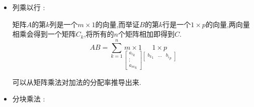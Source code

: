 \documentclass[UTF8,12pt]{ctexbook}
\newcommand{\upDownSum}[2]{\sum\limits_{#2}^{#1}}
\begin{document}
{{{{{\begin{itemize}
{            $$
              a_iB = \begin{bmatrix}
                {a_i}_1 & {a_i}_2 & \dots & {a_i}_n
              \end{bmatrix}
              \begin{bmatrix}
                -- & b_1    & -- \\
                -- & b_2    & -- \\
                \  & \vdots & \  \\
                \  & \vdots & \  \\
                -- & b_n    & --
              \end{bmatrix}
            $$

            $$
              =
              {a_i}_1\begin{bmatrix}
                -- & b_1 & --
              \end{bmatrix}
              +
              {a_i}_2\begin{bmatrix}
                -- & b_2 & --
              \end{bmatrix}
              +
              \dots
              +
              {a_i}_n\begin{bmatrix}
                -- & b_n & --
              \end{bmatrix}
            $$
            }
      \item {
            列乘以行 :

            矩阵$A$的第$k$列是一个$m \times 1$的向量,而举证$B$的第$k$行是一个$1 \times p$的向量,两向量相乘会得到一个矩阵$C_k$,将所有的$n$个矩阵相加即得到$C$.
            $$
              AB = \upDownSum{n}{k = 1}\underset{\begin{bmatrix}
                  {a_i}_k \\
                  \vdots  \\
                  {a_m}_k
                \end{bmatrix}
              }{
                m \times 1
              }
              \underset{\begin{bmatrix}
                  {b_k}_1 & \dots & {b_i}_p
                \end{bmatrix}
              }{
                1 \times p
              }
            $$

            可以从矩阵乘法对加法的分配率推导出来.
            }
      \item {
            分块乘法 :

}
\end{itemize}}}}}}
\end{document}

